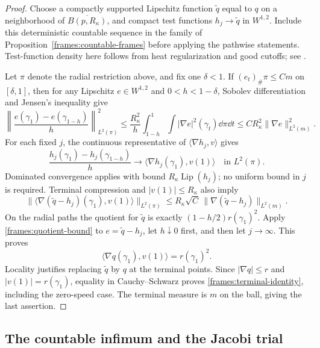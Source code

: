\begin{proof}
 Choose a compactly supported Lipschitz function $\widetilde q$
 equal to $q$ on a neighborhood of $\overline{B(p,R_\kappa)}$,
 and compact test functions $h_j\to\widetilde q$ in $W^{1,2}$.
 Include this deterministic countable sequence in the family
 of Proposition~\ref{frames:countable-frames} before applying
 the pathwise statements.  Test-function density here follows
 from heat regularization and good cutoffs; see \cite{Gigli2018}.

 Let $\pi$ denote the radial restriction above, and fix one
 $\delta<1$.  If $(e_t)_\#\pi\leq C m$ on $[\delta,1]$, then
 for any Lipschitz $e\in W^{1,2}$ and $0<h<1-\delta$, Sobolev
 differentiation and Jensen's inequality give
 \begin{equation}\label{frames:quotient-bound}
  \left\|\frac{e(\gamma_1)-e(\gamma_{1-h})}{h}
                                      \right\|_{L^2(\pi)}^2
   \leq\frac{R_\kappa^2}{h}\int_{1-h}^1
                     \int|\nabla e|^2(\gamma_t)\dd\pi\dd t
   \leq CR_\kappa^2\|\nabla e\|_{L^2(m)}^2.
 \end{equation}
 For each fixed $j$, the continuous representative of
 $\langle\nabla h_j,v\rangle$ gives
 \[
  \frac{h_j(\gamma_1)-h_j(\gamma_{1-h})}{h}
       \longrightarrow\langle\nabla h_j(\gamma_1),v(1)\rangle
       \quad\text{in }L^2(\pi).
 \]
 Dominated convergence applies with bound
 $R_\kappa\operatorname{Lip}(h_j)$; no uniform bound in $j$
 is required.  Terminal compression and $|v(1)|\leq R_\kappa$
 also imply
 \[
  \|\langle\nabla(\widetilde q-h_j)(\gamma_1),v(1)\rangle
                                                \|_{L^2(\pi)}
       \leq R_\kappa\sqrt C\,
                    \|\nabla(\widetilde q-h_j)\|_{L^2(m)}.
 \]
 On the radial paths the quotient for $\widetilde q$ is exactly
 $(1-h/2)r(\gamma_1)^2$.
 Apply \eqref{frames:quotient-bound} to
 $e=\widetilde q-h_j$, let $h\downarrow0$ first, and then let
 $j\to\infty$.  This proves
 \[
  \langle\nabla q(\gamma_1),v(1)\rangle=r(\gamma_1)^2.
 \]
 Locality justifies replacing $\widetilde q$ by $q$ at the
 terminal points.  Since $|\nabla q|\leq r$ and
 $|v(1)|=r(\gamma_1)$, equality in Cauchy--Schwarz proves
 \eqref{frames:terminal-identity}, including the zero-speed
 case.  The terminal measure is $m$ on the ball, giving the
 last assertion.
\end{proof}

\subsection{The countable infimum and the Jacobi trial}

